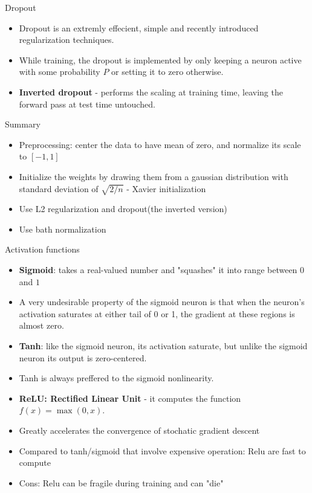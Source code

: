 \documentclass[10pt,mathserif]{beamer}
\begin{document}
\begin{frame}{Dropout}
\begin{itemize}
\item Dropout is an extremly effecient, simple and recently introduced regularization techniques.
\item While training, the dropout is implemented by only keeping a neuron active with some probability $P$ or setting it to zero otherwise.
\item \textbf{Inverted dropout} -  performs the scaling at training time, leaving the forward pass at 
test time untouched.
\end{itemize}
\end{frame}

\begin{frame}{Summary}
\begin{itemize}
\item Preprocessing: center the data to have mean of zero, and normalize its scale to $[-1,1]$
\item Initialize the weights by drawing them from a gaussian distribution with standard deviation of
$\sqrt{2/n}$ - Xavier initialization
\item Use L2 regularization and dropout(the inverted version)
\item Use bath normalization
\end{itemize}
\end{frame}


\begin{frame}{Activation functions}
\begin{itemize}
\item \textbf{Sigmoid}: takes a real-valued number and "squashes" it into range between $0$ and $1$
\item A very undesirable property of the sigmoid neuron is that when the neuron's activation saturates at either tail of 0 or 1, the gradient at these regions is almost zero.
\item \textbf{Tanh}: like the sigmoid neuron, its activation saturate, but unlike the sigmoid neuron
its output is zero-centered.
\item Tanh is always preffered to the sigmoid nonlinearity.
\item \textbf{ReLU: Rectified Linear Unit} - it computes the function $f(x) = \max(0,x)$.
\item Greatly accelerates the convergence of stochatic gradient descent
\item Compared to tanh/sigmoid that involve expensive operation: Relu are fast to compute
\item Cons: Relu can be fragile during training and can "die"
\end{itemize}
\end{frame}
\end{document}
